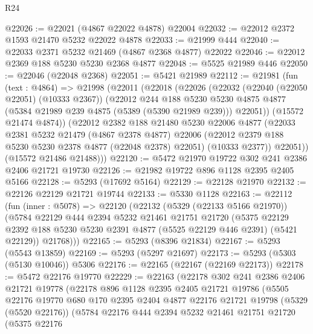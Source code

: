 \begin{lexlean}{R24}
\begin{coremodule}
@22026 := @22021 (@4867 @22022 @4878) @22004
@22032 := @22012 @2372 @1593 @21470 @5232 @22022 @4878
@22033 := @21999 @444
@22040 := @22033 @2371 @5232 @21469 (@4867 @2368 @4877) @22022
@22046 := @22012 @2369 @188 @5230 @5230 @2368 @4877
@22048 := @5525 @21989 @446
@22050 := @22046 (@22048 @2368)
@22051 := @5421 @21989
@22112 := @21981
    (fun (text : @4864) =>
    @21998
      (@22011
        (@22018
          (@22026
            (@22032
              (@22040 (@22050 @22051) (@10333 @2367))
              (@22012
                @244
                @188
                @5230
                @5230
                @4875
                @4877
                (@5384 @21989 @239 @4875 (@5389 (@5390 @21989 @239)))
                @22051))
            (@15572 @21474 @4874))
          (@22012
            @2382
            @188
            @21480
            @5230
            @22006
            @4877
            (@22033
              @2381
              @5232
              @21479
              (@4867 @2378 @4877)
              @22006
              (@22012 @2379 @188 @5230 @5230 @2378 @4877 (@22048 @2378) @22051)
              (@10333 @2377))
            @22051))
        (@15572 @21486 @21488)))
@22120 := @5472 @21970 @19722 @302 @241 @2386 @2406 @21721 @19730
@22126 := @21982 @19722 @896 @1128 @2395 @2405 @5166
@22128 := @5293 (@17692 @5164)
@22129 := @22128 @21970
@22132 := @22126 @22129 @21721 @19744
@22133 := @5330 @1128
@22163 := @22112
    (fun (inner : @5078) =>
    @22120
      (@22132
        (@5329 (@22133 @5166 @21970))
        (@5784
          @22129
          @444
          @2394
          @5232
          @21461
          @21751
          @21720
          (@5375 @22129 @2392 @188 @5230 @5230 @2391 @4877 (@5525 @22129 @446 @2391) (@5421 @22129))
          @21768)))
@22165 := @5293 (@8396 @21834)
@22167 := @5293 (@5543 @13859)
@22169 := @5293 (@5297 @21697)
@22173 := @5293 (@5303 (@5130 @10046)) @5306
@22176 := @22165 (@22167 (@22169 @22173))
@22178 := @5472 @22176 @19770
@22229 := @22163
    (@22178
      @302
      @241
      @2386
      @2406
      @21721
      @19778
      (@22178
        @896
        @1128
        @2395
        @2405
        @21721
        @19786
        (@5505
          @22176
          @19770
          @680
          @170
          @2395
          @2404
          @4877
          @22176
          @21721
          @19798
          (@5329 (@5520 @22176))
          (@5784
            @22176
            @444
            @2394
            @5232
            @21461
            @21751
            @21720
            (@5375
              @22176

\end{coremodule}
\end{lexlean}
